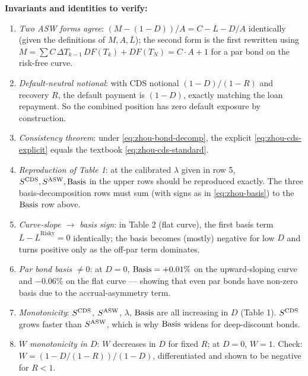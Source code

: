 \documentclass[11pt,a4paper]{article}
\begin{document}
\begin{validation}
\textbf{Invariants and identities to verify:}
\begin{enumerate}[noitemsep]
  \item \emph{Two ASW forms agree}: $(M - (1-D))/A = C - \overline L - D/A$
        identically (given the definitions of $M, A, \overline L$);
        the second form is the first rewritten using
        $M = \sum C\, \Delta T_{k-1}\, DF(T_k) + DF(T_N) = C \cdot A + 1$
        for a par bond on the risk-free curve.
  \item \emph{Default-neutral notional}: with CDS notional
        $(1 - D)/(1 - R)$ and recovery $R$, the default payment is
        $(1 - D)$, exactly matching the loan repayment. So the
        combined position has zero default exposure by construction.
  \item \emph{Consistency theorem}: under \eqref{eq:zhou-bond-decomp},
        the explicit \eqref{eq:zhou-cds-explicit} equals the
        textbook \eqref{eq:zhou-cds-standard}.
  \item \emph{Reproduction of Table 1}: at the calibrated
        $\lambda$ given in row 5, $S^{\mathrm{CDS}}, S^{\mathrm{ASW}}, \mathrm{Basis}$ in the upper
        rows should be reproduced exactly. The three basis-decomposition
        rows must sum (with signs as in \eqref{eq:zhou-basis}) to
        the $\mathrm{Basis}$ row above.
  \item \emph{Curve-slope $\to$ basis sign}: in Table 2 (flat curve),
        the first basis term $\overline L - \overline L^{\text{Risky}} = 0$
        identically; the basis becomes (mostly) negative for low $D$
        and turns positive only as the off-par term dominates.
  \item \emph{Par bond basis $\neq 0$}: at $D = 0$, $\mathrm{Basis} = +0.01\%$
        on the upward-sloping curve and $-0.06\%$ on the flat curve
        --- showing that even par bonds have non-zero basis due to
        the accrual-asymmetry term.
  \item \emph{Monotonicity}: $S^{\mathrm{CDS}}$, $S^{\mathrm{ASW}}$, $\lambda$, $\mathrm{Basis}$
        are all increasing in $D$ (Table 1). $S^{\mathrm{CDS}}$ grows faster
        than $S^{\mathrm{ASW}}$, which is why $\mathrm{Basis}$ widens for deep-discount
        bonds.
  \item \emph{$W$ monotonicity in $D$}: $W$ decreases in $D$ for fixed
        $R$; at $D = 0$, $W = 1$. Check: $W = (1 - D / (1-R)) / (1 - D)$,
        differentiated and shown to be negative for $R < 1$.
\end{enumerate}
\end{validation}

\end{document}
